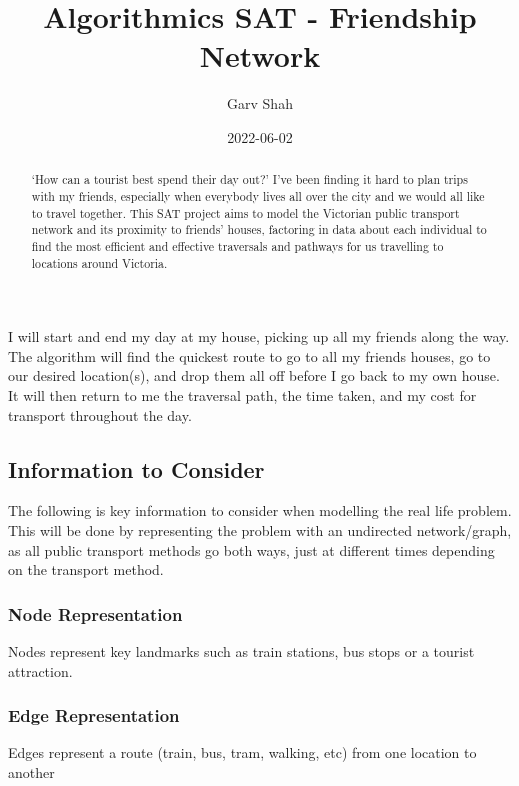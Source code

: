 \documentclass[
]{article}
\title{Algorithmics SAT - Friendship Network}
\author{Garv Shah}
\date{2022-06-02}
\begin{document}
\maketitle
\begin{abstract}
`How can a tourist best spend their day out?' I've been finding it hard
to plan trips with my friends, especially when everybody lives all over
the city and we would all like to travel together. This SAT project aims
to model the Victorian public transport network and its proximity to
friends' houses, factoring in data about each individual to find the
most efficient and effective traversals and pathways for us travelling
to locations around Victoria.
\end{abstract}

I will start and end my day at my house, picking up all my friends along
the way. The algorithm will find the quickest route to go to all my
friends\textquotesingle{} houses, go to our desired location(s), and
drop them all off before I go back to my own house. It will then return
to me the traversal path, the time taken, and my cost for transport
throughout the day.

\hypertarget{information-to-consider}{%
\subsection{Information to Consider}\label{information-to-consider}}

The following is key information to consider when modelling the real
life problem. This will be done by representing the problem with an
undirected network/graph, as all public transport methods go both ways,
just at different times depending on the transport method.

\hypertarget{node-representation}{%
\subsubsection{Node Representation}\label{node-representation}}

Nodes represent key landmarks such as train stations, bus stops or a
tourist attraction.

\hypertarget{edge-representation}{%
\subsubsection{Edge Representation}\label{edge-representation}}

Edges represent a route (train, bus, tram, walking, etc) from one
location to another
\end{document}

